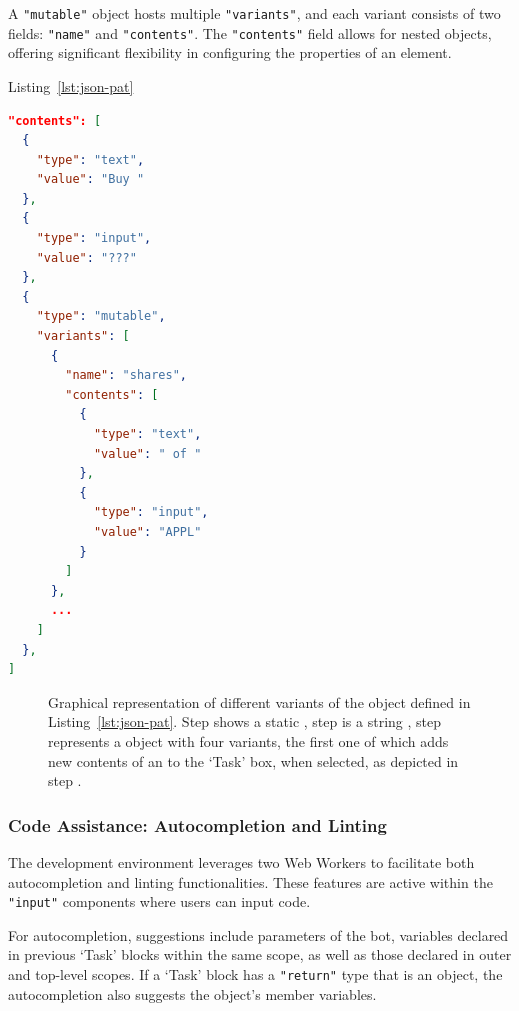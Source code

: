 A \texttt{"mutable"} object hosts multiple \texttt{"variants"}, and each variant consists of two fields: \texttt{"name"} and \texttt{"contents"}. The \texttt{"contents"} field allows for nested objects, offering significant flexibility in configuring the properties of an element.

Listing~\ref{lst:json-pat} 

\begin{lstlisting}[language=json,firstnumber=1,caption={The structure of \code{"contents"} object.},label=lst:json-pat]
"contents": [
  {
    "type": "text",
    "value": "Buy "
  },
  {
    "type": "input",
    "value": "???"
  },
  {
    "type": "mutable",
    "variants": [
      {
        "name": "shares",
        "contents": [
          {
            "type": "text",
            "value": " of "
          },
          {
            "type": "input",
            "value": "APPL"
          }
        ]
      },
      ...
    ]
  },
]
\end{lstlisting}


\begin{figure}[!ht]
  
    \caption{Graphical representation of different variants of the object defined in Listing~\ref{lst:json-pat}. Step  shows a static , step  is a string , step  represents a  object with four variants, the first one of which adds new contents of an  to the `Task' box, when selected, as depicted in step .}
    \label{fig:variants}
\end{figure}

\subsubsection{Code Assistance: Autocompletion and Linting}
\label{sec:code_assistance}

The development environment leverages two Web Workers to facilitate both autocompletion and linting functionalities. These features are active within the \texttt{"input"} components where users can input code.

For autocompletion, suggestions include parameters of the bot, variables declared in previous `Task' blocks within the same scope, as well as those declared in outer and top-level scopes. If a `Task' block has a \texttt{"return"} type that is an object, the autocompletion also suggests the object's member variables.


